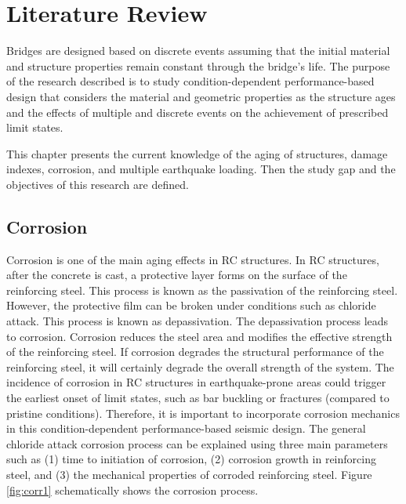 \chapter{Literature Review}
\label{chap-two}
Bridges are designed based on discrete events assuming that the initial material and structure properties remain constant through the bridge's life. The purpose of the research described is to study condition-dependent performance-based design that considers the material and geometric properties as the structure ages and the effects of multiple and discrete events on the achievement of prescribed limit states.

This chapter presents the current knowledge of the aging of structures, damage indexes, corrosion, and multiple earthquake loading. Then the study gap and the objectives of this research are defined.

\section{Corrosion}

Corrosion is one of the main aging effects in RC structures. In RC structures, after the concrete is cast, a protective layer forms on the surface of the reinforcing steel. This process is known as the passivation of the reinforcing steel. However, the protective film can be broken under conditions such as chloride attack. This process is known as depassivation. The depassivation process leads to corrosion. Corrosion reduces the steel area and modifies the effective strength of the reinforcing steel. If corrosion degrades the structural performance of the reinforcing steel, it will certainly degrade the overall strength of the system. The incidence of corrosion in RC structures in earthquake-prone areas could trigger the earliest onset of limit states, such as bar buckling or fractures (compared to pristine conditions). Therefore, it is important to incorporate corrosion mechanics in this condition-dependent performance-based seismic design. The general chloride attack corrosion process can be explained using three main parameters such as (1) time to initiation of corrosion, (2) corrosion growth in reinforcing steel, and (3) the mechanical properties of corroded reinforcing steel. Figure \ref{fig:corr1} schematically shows the corrosion process.

